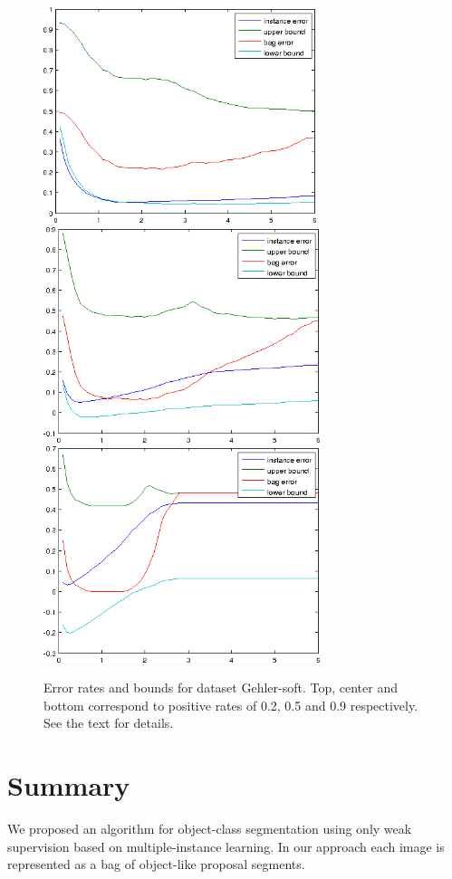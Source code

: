 \begin{figure}[tbp]
	\begin{center}
		\includegraphics[height=63mm]{images/non_iid_02.png}
		\includegraphics[height=63mm]{images/non_iid_05.png}
		\includegraphics[height=63mm]{images/non_iid_09.png}
	\end{center}
	\caption{Error rates and bounds for dataset Gehler-soft. Top, center and bottom correspond to positive rates of 0.2, 0.5 and 0.9 respectively.
    See the text for details.}
\end{figure}

\section{Summary}
We proposed an algorithm for object-class segmentation using only weak supervision based on
multiple-instance learning. In our approach each image is represented as a bag of object-like
proposal segments.

